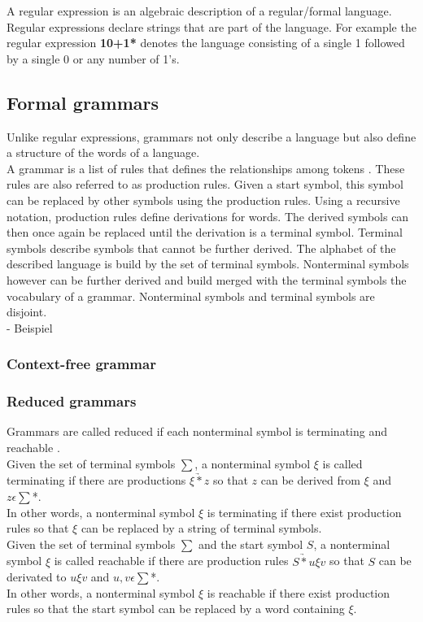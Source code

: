 A regular expression is an algebraic description of a regular/formal language. Regular expressions declare strings that are part of the language. \cite{AutomataTheory.2007} 
For example the regular expression \textbf{10+1*} denotes the language consisting of a single 1 followed by a single 0 or any number of 1's. 


\subsection{Formal grammars}\label{sec:BackgroundGrammar}
Unlike regular expressions, grammars not only describe a language but also define a structure of the words of a language.\\
A grammar is a list of rules that defines the relationships among tokens \cite{LexYacc.1992}.
These rules are also referred to as production rules.
Given a start symbol, this symbol can be replaced by other symbols using the production rules.
Using a recursive notation, production rules define derivations for words. The derived symbols can then once again be replaced until the derivation is a terminal symbol.  
Terminal symbols describe symbols that cannot be further derived. The alphabet of the described language is build by the set of terminal symbols.
Nonterminal symbols however can be further derived and build  merged with the terminal symbols the vocabulary of a grammar. Nonterminal symbols and terminal symbols are disjoint. 
\\
- Beispiel

\subsubsection{Context-free grammar}

\subsubsection{Reduced grammars}
Grammars are called reduced if each nonterminal symbol is terminating and reachable \cite{Cremers75}. \\
Given the set of terminal symbols $\sum$, a nonterminal symbol $\xi$ is called terminating if there are productions $\xi \underrightarrow{*} z$ so that $z$ can be derived from $\xi$ and $z \epsilon \sum$*. \\
In other words, a nonterminal symbol $\xi$ is terminating if there exist production rules so that  $\xi$ can be replaced by a string of terminal symbols. \cite{Cremers75}\\
Given the set of terminal symbols $\sum$ and the start symbol $S$, a nonterminal symbol $\xi$ is called reachable if there are production rules $S \underrightarrow{*} u\xi v$ so that $S$ can be derivated to $u\xi v$ and $u,v \epsilon \sum$*. \\
In other words, a nonterminal symbol $\xi$ is reachable if there exist production rules so that the start symbol can be replaced by a word containing $\xi$. \cite{Cremers75}

